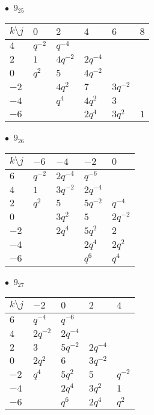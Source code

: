 %
\begin{minipage}{\linewidth}
$\bullet\ $ $9_{25}$ \vspace{0.5em} \\
\begin{tabular}{l|lllll}
$k \setminus j$ & $0$ & $2$ & $4$ & $6$ & $8$ \\
\hline
$4$ & $q^{-2}$ & $q^{-4}$ &  &  &  \\
$2$ & $1$ & $4q^{-2}$ & $2q^{-4}$ &  &  \\
$0$ & $q^{2}$ & $5$ & $4q^{-2}$ &  &  \\
$-2$ &  & $4q^{2}$ & $7$ & $3q^{-2}$ &  \\
$-4$ &  & $q^{4}$ & $4q^{2}$ & $3$ &  \\
$-6$ &  &  & $2q^{4}$ & $3q^{2}$ & $1$ \\
\end{tabular}
\vspace{2em}
\end{minipage}
%
\begin{minipage}{\linewidth}
$\bullet\ $ $9_{26}$ \vspace{0.5em} \\
\begin{tabular}{l|llll}
$k \setminus j$ & $-6$ & $-4$ & $-2$ & $0$ \\
\hline
$6$ & $q^{-2}$ & $2q^{-4}$ & $q^{-6}$ &  \\
$4$ & $1$ & $3q^{-2}$ & $2q^{-4}$ &  \\
$2$ & $q^{2}$ & $5$ & $5q^{-2}$ & $q^{-4}$ \\
$0$ &  & $3q^{2}$ & $5$ & $2q^{-2}$ \\
$-2$ &  & $2q^{4}$ & $5q^{2}$ & $2$ \\
$-4$ &  &  & $2q^{4}$ & $2q^{2}$ \\
$-6$ &  &  & $q^{6}$ & $q^{4}$ \\
\end{tabular}
\vspace{2em}
\end{minipage}
%
\begin{minipage}{\linewidth}
$\bullet\ $ $9_{27}$ \vspace{0.5em} \\
\begin{tabular}{l|llll}
$k \setminus j$ & $-2$ & $0$ & $2$ & $4$ \\
\hline
$6$ & $q^{-4}$ & $q^{-6}$ &  &  \\
$4$ & $2q^{-2}$ & $2q^{-4}$ &  &  \\
$2$ & $3$ & $5q^{-2}$ & $2q^{-4}$ &  \\
$0$ & $2q^{2}$ & $6$ & $3q^{-2}$ &  \\
$-2$ & $q^{4}$ & $5q^{2}$ & $5$ & $q^{-2}$ \\
$-4$ &  & $2q^{4}$ & $3q^{2}$ & $1$ \\
$-6$ &  & $q^{6}$ & $2q^{4}$ & $q^{2}$ \\
\end{tabular}
\vspace{2em}
\end{minipage}
